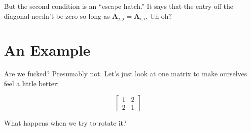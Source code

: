 \documentclass[11pt, oneside]{amsart}
\newcommand{\mtx}[1]{\bm{#1}}
\newcommand{\mtxA}{\mtx{A}}
\begin{document}
But the second condition is an ``escape hatch.'' It says that the entry
off the diagonal needn't be zero so long as $\mtxA_{j, j} = \mtxA_{i,
i}$. Uh-oh?

\section{An Example}

Are we fucked? Presumably not. Let's just look at one matrix to make
ourselves feel a little better:

\begin{equation*}
  \begin{bmatrix}
    1 & 2 \\
    2 & 1
  \end{bmatrix}
\end{equation*}

What happens when we try to rotate it?
\end{document}
